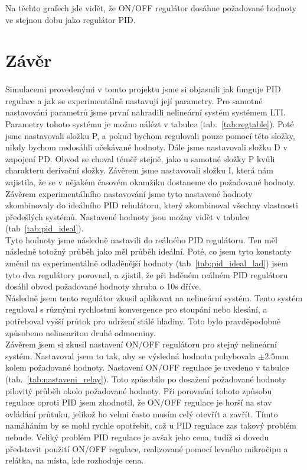 \documentclass{article}
\begin{document}
\indent Na těchto grafech jde vidět, že ON/OFF regulátor dosáhne požadované hodnoty ve stejnou dobu jako regulátor PID.

\section{Závěr}
\paragraph{}
Simulacemi provedenými v tomto projektu jsme si objasnili jak funguje PID regulace a jak se experimentálně nastavují její parametry. Pro samotné nastavování parametrů jsme první nahradili nelineární systém systémem LTI. Parametry tohoto systému je možno nálézt v tabulce (tab.~\ref{tab:regtable}).
\indent Poté jsme nastavovali složku P, a pokud bychom regulovali pouze pomocí této složky, nikdy bychom nedosáhli očekávané hodnoty. Dále jsme nastavovali složku D v zapojení PD. Obvod se choval téměř stejně, jako u samotné složky P kvůli charakteru derivační složky. Závěrem jsme nastavovali složku I, která nám zajistila, že se v nějakém časovém okamžiku dostaneme do požadované hodnoty. Závěrem experimentálního nastavování jsme tyto nastavené hodnoty zkombinovaly do ideálního PID rehulátoru, který zkombinoval všechny vlastnosti předešlých systémů. Nastavené hodnoty jsou možny vidět v tabulce (tab~\ref{tab:pid_ideal}).\\
\indent Tyto hodnoty jsme následně nastavili do reálného PID regulátoru. Ten měl následně totožný průběh jako měl průběh ideální. Poté, co jsem tyto konstanty změnil na experimentálně odladěnější hodnoty (tab~\ref{tab:pid_ideal_lad}) jsem tyto dva regulátory porovnal, a zjistil, že při laděném reálném PID regulátoru dosáhl obvod požadované hodnoty zhruba o 10s dříve. \\
\indent Následně jsem tento regulátor zkusil aplikovat na nelineární systém. Tento systém reguloval s různými rychlostmi konvergence pro stoupání nebo klesání, a potřeboval vyšší průtok pro udržení stálé hladiny. Toto bylo pravděpodobně způsobeno nelinearitou druhé odmocniny.\\
\indent Závěrem jsem si zkusil nastavení ON/OFF regulátoru pro stejný nelineární systém. Nastavoval jsem to tak, aby se výsledná hodnota pohybovala $\pm$2.5mm kolem požadované hodnoty. Nastavení ON/OFF regulace je uvedeno v tabulce (tab.~\ref{tab:nastaveni_relay}). Toto způsobilo po dosažení požadované hodnoty pilovitý průběh okolo požadované hodnoty. Při porovnání tohoto způsobu regulace oproti PID jsem zhodnotil, že ON/OFF regulace je horší na stav ovládání průtuku, jelikož ho velmi často musím celý otevřít a zavřít. Tímto namáháním by se mohl rychle opotřebit, což u PID regulace zas takový problém nebude. Veliký problém PID regulace je avšak jeho cena, tudíž si dovedu představit použití ON/OFF regulace, realizované pomocí levného mikročipu a relátka, na místa, kde rozhoduje cena.


    \renewcommand{\sectionmark}[1]{\markright{#1}}
    \cleardoublepage
    \appendix
    
\end{document}
